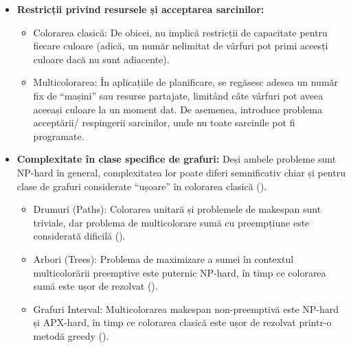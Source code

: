 \begin{itemize}
 \item {\bf Restricții privind resursele și acceptarea sarcinilor:}
  \begin{itemize}
    \item Colorarea clasică: De obicei, nu implică restricții de capacitate pentru fiecare culoare (adică, un număr nelimitat de vârfuri pot primi aceesți culoare dacă nu sunt adiacente).
    \item Multicolorarea: În aplicațiile de planificare, se regăsesc adesea un număr fix de ``mașini'' sau resurse partajate, limitând câte vârfuri pot aveea aceeași culoare la un moment dat. De asemenea, introduce problema acceptării/ respingerii sarcinilor, unde nu toate sarcinile pot fi programate.
  \end{itemize}
  \item {\bf Complexitate în clase specifice de grafuri:}
   Deși ambele probleme sunt NP-hard în general, complexitatea lor poate diferi semnificativ chiar și pentru clase de grafuri considerate ``ușoare'' în colorarea clasică (\cite{halldorsson2004multicoloring}).
  \begin{itemize}
   \item Drumuri (Paths): Colorarea unitară și problemele de makespan sunt triviale, dar problema de multicolorare sumă cu preempțiune este considerată dificilă (\cite{halldorsson2004multicoloring}).
   \item Arbori (Trees): Problema de maximizare a sumei în contextul multicolorării preemptive este puternic NP-hard, în timp ce colorarea sumă este ușor de rezolvat (\cite{halldorsson2004multicoloring}).
  \item Grafuri Interval: Multicolorarea makespan non-preemptivă este NP-hard și APX-hard, în timp ce colorarea clasică este ușor de rezolvat printr-o metodă greedy (\cite{halldorsson2004multicoloring}).
  \end{itemize}

 \end{itemize}
